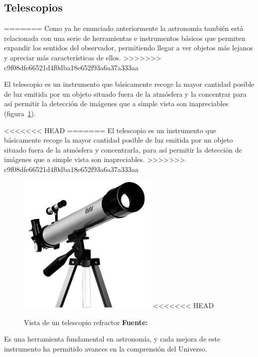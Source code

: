 \begin{itemize}
\begin{itemize}
\subsection{Telescopios} \label{telescopio}
=======
Como ya he enunciado anteriormente la astronomía también está relacionada  con una serie de herramientas e instrumentos básicos que permiten expandir los sentidos del observador, permitiendo llegar a ver objetos más lejanos y apreciar más características de ellos.  
>>>>>>> c9f08dfe66521d4f0dba18e652f93a6a37a333aa

El telescopio es un instrumento que básicamente recoge la mayor cantidad posible de luz emitida por un objeto situado fuera de la atmósfera y la concentrar para así permitir la detección de imágenes que a simple vista son inapreciables \cite{telescopio} (figura~\ref{fig:telescopio}).

<<<<<<< HEAD
=======
El telescopio es un instrumento que básicamente recoge la mayor cantidad posible de luz emitida por un objeto situado fuera de la atmósfera y concentrarla, para así permitir la detección de imágenes que a simple vista son inapreciables\cite{Telescopio}.
>>>>>>> c9f08dfe66521d4f0dba18e652f93a6a37a333aa


\begin{figure}[!ht]
	\begin{center}
		\includegraphics[width=0.6\textwidth]{../images/telescopio2.jpg}
<<<<<<< HEAD
			\caption[Telescopio]{Vista de un telescopio refractor \textbf{Fuente:} \cite{telescopio}}	
		\label{fig:telescopio}
	\end{center}
\end{figure}


 Es una herramienta fundamental en astronomía, y cada mejora de este instrumento ha permitido avances en la comprensión del Universo.


\end{itemize}
\end{itemize}
